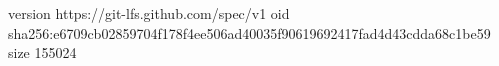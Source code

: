 version https://git-lfs.github.com/spec/v1
oid sha256:e6709cb02859704f178f4ee506ad40035f90619692417fad4d43cdda68c1be59
size 155024
